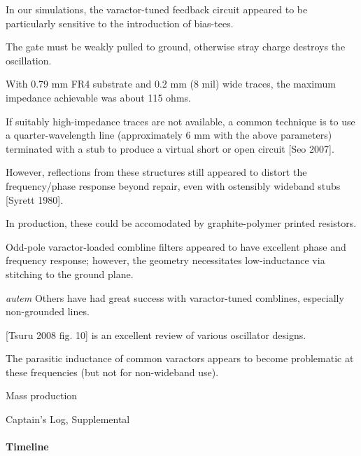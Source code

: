 \documentclass[fleqn,10pt]{article}
\begin{document}
\begin{multicols}{1}
In our simulations, the varactor-tuned feedback circuit appeared to be particularly sensitive to the introduction of bias-tees. 


The gate must be weakly pulled to ground, otherwise stray charge destroys the oscillation.




With 0.79 mm FR4 substrate and 0.2 mm (8 mil) wide traces, the maximum impedance achievable was about 115 ohms. 

If suitably high-impedance traces are not available, a common technique is to use a quarter-wavelength line (approximately 6 mm with the above parameters) terminated with a stub to produce a virtual short or open circuit [Seo 2007]. 

However, reflections from these structures still appeared to distort the frequency/phase response beyond repair, even with ostensibly wideband stubs [Syrett 1980].

\noindent{}

In production, these could be accomodated by graphite-polymer printed resistors. 


Odd-pole varactor-loaded combline filters appeared to have excellent phase and frequency response; however, the geometry necessitates low-inductance via stitching to the ground plane.

\begin{autem}
	{\it autem} Others have had great success with varactor-tuned comblines, especially non-grounded lines.
\end{autem}

[Tsuru 2008 fig. 10] is an excellent review of various oscillator designs.

The parasitic inductance of common varactors appears to become problematic at these frequencies (but not for non-wideband use).


\clearpage

{\Large Mass production}


\clearpage


{\Large Captain's Log, Supplemental}

\paragraph{Timeline}


\end{multicols}
\end{document}
